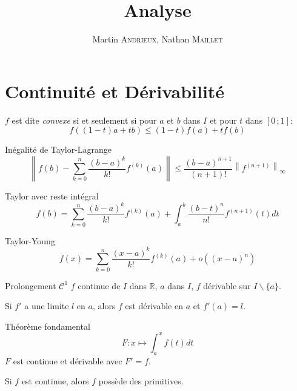 \documentclass[french, a4paper, 10pt, twocolumn]{article}
\title{Analyse}
\author{Martin \textsc{Andrieux}, Nathan \textsc{Maillet}}
\date{}
\newcommand{\ssi}{si et seulement si\xspace}		%
\newcommand{\R}{\mathbb{R}}   %
\newcommand{\po}{\left(}         %
\newcommand{\pf}{\right)}        %
\newcommand{\pof}[1]{\po #1 \pf} %
\newcommand{\interff}[2]{\left[#1\,;#2\right]}   %
\begin{document}
\maketitle

\section{Continuité et Dérivabilité}
\begin{definition}
  \(f\) est dite \emph{convexe} \ssi pour \(a\) et \(b\) dans \(I\) et pour \(t\) dans \(\interff{0}{1}\):
  \[f((1-t)a+tb)\leqslant (1-t)f(a)+tf(b)\]
\end{definition}

\begin{theoreme}{Inégalité de Taylor-Lagrange}
  \[\left\lVert f(b)-\sum_{k=0}^{n}\dfrac{\pof{b-a}^{k}}{k!}f^{(k)}(a)\right\rVert \leqslant\dfrac{\pof{b-a}^{n+1}}{(n+1)!}\left\lVert f^{(n+1)}\right\rVert_{\infty}\]
\end{theoreme}

\begin{theoreme}{Taylor avec reste intégral}
\[f(b)=\sum_{k=0}^{n}\dfrac{\pof{b-a}^{k}}{k!}f^{(k)}(a)+\int_{a}^{b}\dfrac{\pof{b-t}^{n}}{n!}f^{(n+1)}(t)dt\]
\end{theoreme}

\begin{theoreme}{Taylor-Young}
\[f(x)=\sum_{k=0}^{n}\dfrac{\pof{x-a}^{k}}{k!}f^{(k)}(a)+o\pof{(x-a)^{n}}\]
\end{theoreme}

\begin{theoreme}{Prolongement \(\mathcal C^{1}\)}
  \(f\) continue de \(I\) dans \(\R\), \(a\) dans \(I\), \(f\) dérivable sur \(I\backslash \lbrace a\rbrace\).

  Si \(f'\) a une limite \(l\) en \(a\), alors \(f\) est dérivable en \(a\) et \(f'(a)=l\).
\end{theoreme}

\begin{theoreme}{Théorème fondamental}
  \[F : x\mapsto \int_{a}^{x}f(t)dt\]
  \(F\) est continue et dérivable avec \(F'=f\).

  Si \(f\) est continue, alors \(f\) possède des primitives.
\end{theoreme}
\end{document}
